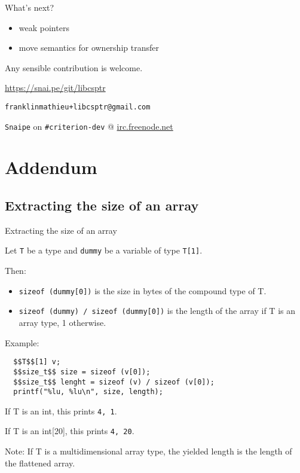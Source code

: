 \documentclass[10pt]{beamer}
\begin{document}

\begin{frame}[fragile]{What's next?}
  \begin{itemize}
    \item weak pointers
    \item move semantics for ownership transfer
  \end{itemize}

  \begin{center}
    Any sensible contribution is welcome.

    \large \faGithub \normalsize\hspace{0.7em}
    \url{https://snai.pe/git/libcsptr}

    \large \faEnvelope \normalsize\hspace{0.7em}
    \verb|franklinmathieu+libcsptr@gmail.com|

    \verb|Snaipe| on \verb|#criterion-dev| @ \url{irc.freenode.net}

  \end{center}
\end{frame}


\appendix
\section{Addendum}

\subsection{Extracting the size of an array}

\begin{frame}[fragile]{Extracting the size of an array}

  Let \verb|T| be a type and \verb|dummy| be a variable of type \verb|T[1]|.

  Then:

  \begin{itemize}
    \item \verb|sizeof (dummy[0])| is the size in bytes of the compound type of T.
    \item \verb|sizeof (dummy) / sizeof (dummy[0])| is the length of the array if T is an array type, 1 otherwise.
  \end{itemize}

  Example:
  \begin{lstlisting}
  $$T$$[1] v;
  $$size_t$$ size = sizeof (v[0]);
  $$size_t$$ lenght = sizeof (v) / sizeof (v[0]);
  printf("%lu, %lu\n", size, length);
  \end{lstlisting}

  If T is an int, this prints \verb|4, 1|.

  If T is an int[20], this prints \verb|4, 20|.

  Note: If T is a multidimensional array type, the yielded length is the length of the flattened array.

\end{frame}
\end{document}
